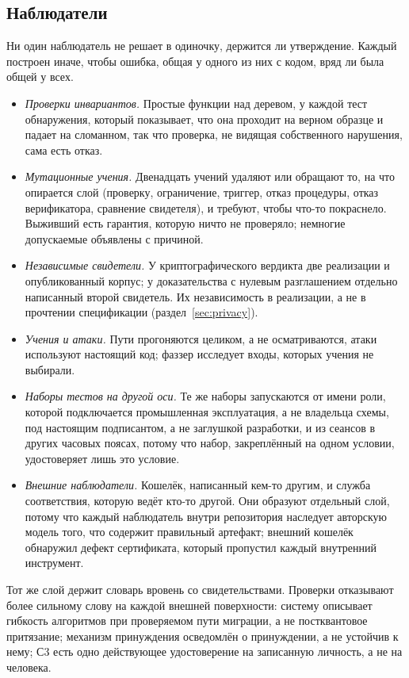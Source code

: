 \subsection{Наблюдатели}

Ни один наблюдатель не решает в одиночку, держится ли утверждение. Каждый построен иначе, чтобы ошибка,
общая у одного из них с кодом, вряд ли была общей у всех.

\begin{itemize}
  \item \emph{Проверки инвариантов.} Простые функции над деревом, у каждой тест обнаружения, который
    показывает, что она проходит на верном образце и падает на сломанном, так что проверка, не видящая
    собственного нарушения, сама есть отказ.
  \item \emph{Мутационные учения.} Двенадцать учений удаляют или обращают то, на что опирается слой
    (проверку, ограничение, триггер, отказ процедуры, отказ верификатора, сравнение свидетеля), и
    требуют, чтобы что-то покраснело. Выживший есть гарантия, которую ничто не проверяло; немногие
    допускаемые объявлены с причиной.
  \item \emph{Независимые свидетели.} У криптографического вердикта две реализации и опубликованный
    корпус; у доказательства с нулевым разглашением отдельно написанный второй свидетель. Их
    независимость в реализации, а не в прочтении спецификации (раздел~\ref{sec:privacy}).
  \item \emph{Учения и атаки.} Пути прогоняются целиком, а не осматриваются, атаки используют настоящий
    код; фаззер исследует входы, которых учения не выбирали.
  \item \emph{Наборы тестов на другой оси.} Те же наборы запускаются от имени роли, которой подключается
    промышленная эксплуатация, а не владельца схемы, под настоящим подписантом, а не заглушкой
    разработки, и из сеансов в других часовых поясах, потому что набор, закреплённый на одном условии,
    удостоверяет лишь это условие.
  \item \emph{Внешние наблюдатели.} Кошелёк, написанный кем-то другим, и служба соответствия, которую
    ведёт кто-то другой. Они образуют отдельный слой, потому что каждый наблюдатель внутри репозитория
    наследует авторскую модель того, что содержит правильный артефакт; внешний кошелёк обнаружил дефект
    сертификата, который пропустил каждый внутренний инструмент.
\end{itemize}

Тот же слой держит словарь вровень со свидетельствами. Проверки отказывают более сильному слову на
каждой внешней поверхности: систему описывает гибкость алгоритмов при проверяемом пути миграции, а не
постквантовое притязание; механизм принуждения осведомлён о принуждении, а не устойчив к нему; С3 есть
одно действующее удостоверение на записанную личность, а не на человека.

